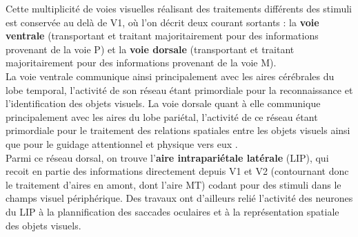 Cette multiplicité de voies visuelles réalisant des traitements différents des stimuli est conservée au delà de V1, où l'on décrit deux courant sortants : la \textbf{voie ventrale} (transportant et traitant majoritairement pour des informations provenant de la voie P) et la \textbf{voie dorsale} (transportant et traitant majoritairement pour des informations provenant de la voie M).\\
La voie ventrale communique ainsi principalement avec les aires cérébrales du lobe temporal, l'activité de son réseau étant primordiale pour la reconnaissance et l'identification des objets visuels. La voie dorsale quant à elle communique principalement avec les aires du lobe pariétal, l'activité de ce réseau étant primordiale pour le traitement des relations spatiales entre les objets visuels ainsi que pour le guidage attentionnel et physique vers eux \autocite{Werner2014}.\\
Parmi ce réseau dorsal, on trouve l'\textbf{aire intrapariétale latérale} (LIP), qui recoit en partie des informations directement depuis V1 et V2 (contournant donc le traitement d'aires en amont, dont l'aire MT) codant pour des stimuli dans le champs visuel périphérique. Des travaux ont d'ailleurs relié l'activité des neurones du LIP à la plannification des saccades oculaires et à la représentation spatiale des objets visuels.


